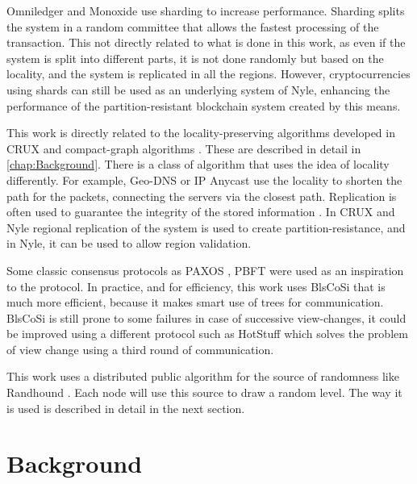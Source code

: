 \documentclass[a4paper,11pt,oneside]{report}
\begin{document}
Omniledger \cite{Kokoris-Kogias2017} and Monoxide \cite{Wang2019} use sharding
to increase performance. Sharding splits the system in a random committee that
allows the fastest processing of the transaction. This not directly related to
what is done in this work, as even if the system is split into different parts,
it is not done randomly but based on the locality, and the system is replicated
in all the regions. However, cryptocurrencies using shards can still be used as
an underlying system of Nyle, enhancing the performance of the
partition-resistant blockchain system created by this means.

This work is directly related to the locality-preserving algorithms developed
in CRUX \cite{Basescu2014} and compact-graph algorithms \cite{Thorup2005}.
These are described in detail in \autoref{chap:Background}. There is a class of
algorithm that uses the idea of locality differently. For example, Geo-DNS
\cite{Katz-bassett2006} or IP Anycast \cite{Abley2006} use the locality to
shorten the path for the packets, connecting the servers via the closest path.
Replication is often used to guarantee the integrity of the stored information
\cite{Mokadem2015}. In CRUX \cite{Basescu2014} and Nyle regional replication of
the system is used to create partition-resistance, and in Nyle, it can be used
to allow region validation.

Some classic consensus protocols as PAXOS \cite{Lamport2000}, PBFT
\cite{Castro1999} were used as an inspiration to the protocol. In practice, and
for efficiency, this work uses BlsCoSi \cite{Boneh2018} that is much more
efficient, because it makes smart use of trees for communication.  BlsCoSi
\cite{Boneh2018} is still prone to some failures in case of successive
view-changes, it could be improved using a different protocol such as HotStuff
\cite{Yin2018} which solves the problem of view change using a third round of
communication. 

This work uses a distributed public algorithm for the source of randomness like
Randhound \cite{Syta2016}. Each node will use this source to draw a random
level. The way it is used is described in detail in the next section. 


\chapter{Background} \label{chap:Background} %
\end{document}
